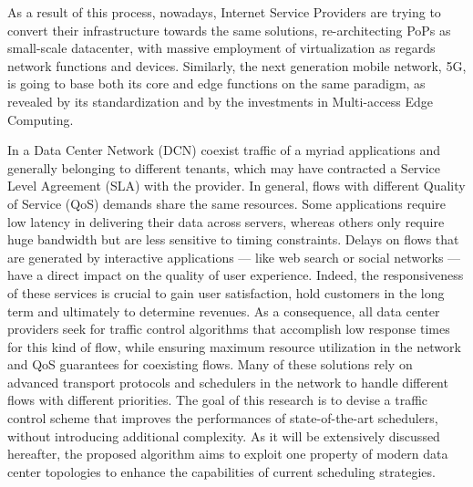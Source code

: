 As a result of this process, nowadays, Internet Service Providers are trying to convert their infrastructure towards the same solutions, re-architecting PoPs as small-scale datacenter, with massive employment of virtualization as regards network functions and devices. Similarly, the next generation mobile network, 5G, is going to base both its core and edge functions on the same paradigm, as revealed by its standardization and by the investments in Multi-access Edge Computing. 

In a Data Center Network (DCN) coexist traffic of a myriad applications and generally belonging to different tenants, which may have contracted a Service Level Agreement (SLA) with the provider. In general, flows with different Quality of Service (QoS) demands share the same resources. Some applications require low latency in delivering their data across servers, whereas others only require huge bandwidth but are less sensitive to timing constraints. Delays on flows that are generated by interactive applications --- like web search or social networks --- have a direct impact on the quality of user experience. Indeed, the responsiveness of these services is crucial to gain user satisfaction, hold customers in the long term and ultimately to determine revenues. As a consequence, all data center providers seek for traffic control algorithms that accomplish low response times for this kind of flow, while ensuring maximum resource utilization in the network and QoS guarantees for coexisting flows. Many of these solutions rely on advanced transport protocols and schedulers in the network to handle different flows with different priorities. The goal of this research is to devise a traffic control scheme that improves the performances of state-of-the-art schedulers, without introducing additional complexity. As it will be extensively discussed hereafter, the proposed algorithm aims to exploit one property of modern data center topologies to enhance the capabilities of current scheduling strategies. 

